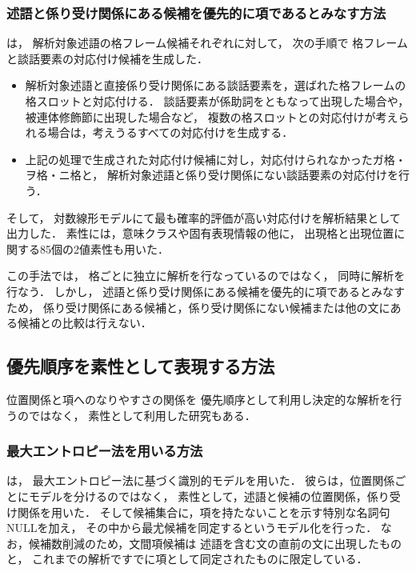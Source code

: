 \documentclass[japanese]{jnlp_1.4}
\newcommand{\newcite}[1]{}
\begin{document}
\subsubsection{述語と係り受け関係にある候補を優先的に項であるとみなす方法}

\newcite{Sasano:IPSJ:2011}は，
解析対象述語の格フレーム候補それぞれに対して，
次の手順で
格フレームと談話要素の対応付け候補を生成した．

\begin{itemize}
\item 解析対象述語と直接係り受け関係にある談話要素を，選ばれた格フレームの格スロットと対応付ける．
談話要素が係助詞をともなって出現した場合や，被連体修飾節に出現した場合など，
複数の格スロットとの対応付けが考えられる場合は，考えうるすべての対応付けを生成する．
\item 
上記の処理で生成された対応付け候補に対し，対応付けられなかったガ格・ヲ格・ニ格と，
解析対象述語と係り受け関係にない談話要素の対応付けを行う．
\end{itemize}

そして，
対数線形モデルにて最も確率的評価が高い対応付けを解析結果として出力した．
素性には，意味クラスや固有表現情報の他に，
出現格と出現位置に関する85個の2値素性も用いた．


この手法では，
格ごとに独立に解析を行なっているのではなく，
同時に解析を行なう．
しかし，
述語と係り受け関係にある候補を優先的に項であるとみなすため，
係り受け関係にある候補と，係り受け関係にない候補または他の文にある候補との比較は行えない．


\subsection{優先順序を素性として表現する方法}

位置関係と項へのなりやすさの関係を
優先順序として利用し決定的な解析を行うのではなく，
素性として利用した研究もある．

\subsubsection{最大エントロピー法を用いる方法}

\newcite{Imamura:2009:ACL}は，
最大エントロピー法に基づく識別的モデルを用いた．
彼らは，位置関係ごとにモデルを分けるのではなく，
素性として，述語と候補の位置関係，係り受け関係を用いた．
そして候補集合に，項を持たないことを示す特別な名詞句NULLを加え，
その中から最尤候補を同定するというモデル化を行った．
なお，候補数削減のため，文間項候補は
述語を含む文の直前の文に出現したものと，
これまでの解析ですでに項として同定されたものに限定している．
\end{document}
